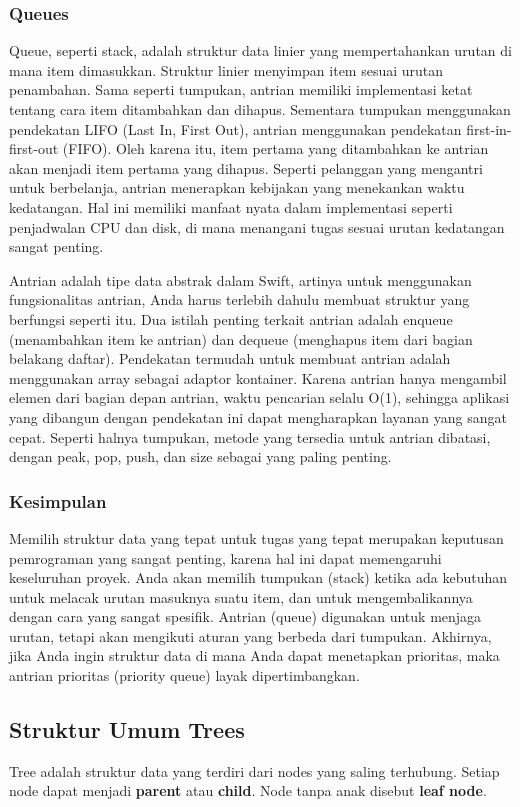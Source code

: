 \documentclass{article}
\begin{document}
\subsubsection{Queues}
Queue, seperti stack, adalah struktur data linier yang mempertahankan urutan di mana item dimasukkan. Struktur linier menyimpan item sesuai urutan penambahan. Sama seperti tumpukan, antrian memiliki implementasi ketat tentang cara item ditambahkan dan dihapus. Sementara tumpukan menggunakan pendekatan LIFO (Last In, First Out), antrian menggunakan pendekatan first-in-first-out (FIFO). Oleh karena itu, item pertama yang ditambahkan ke antrian akan menjadi item pertama yang dihapus. Seperti pelanggan yang mengantri untuk berbelanja, antrian menerapkan kebijakan yang menekankan waktu kedatangan. Hal ini memiliki manfaat nyata dalam implementasi seperti penjadwalan CPU dan disk, di mana menangani tugas sesuai urutan kedatangan sangat penting.

Antrian adalah tipe data abstrak dalam Swift, artinya untuk menggunakan fungsionalitas antrian, Anda harus terlebih dahulu membuat struktur yang berfungsi seperti itu. Dua istilah penting terkait antrian adalah enqueue (menambahkan item ke antrian) dan dequeue (menghapus item dari bagian belakang daftar). Pendekatan termudah untuk membuat antrian adalah menggunakan array sebagai adaptor kontainer. Karena antrian hanya mengambil elemen dari bagian depan antrian, waktu pencarian selalu O(1), sehingga aplikasi yang dibangun dengan pendekatan ini dapat mengharapkan layanan yang sangat cepat. Seperti halnya tumpukan, metode yang tersedia untuk antrian dibatasi, dengan peak, pop, push, dan size sebagai yang paling penting.

\subsubsection{Kesimpulan}
Memilih struktur data yang tepat untuk tugas yang tepat merupakan keputusan pemrograman yang sangat penting, karena hal ini dapat memengaruhi keseluruhan proyek. Anda akan memilih tumpukan (stack) ketika ada kebutuhan untuk melacak urutan masuknya suatu item, dan untuk mengembalikannya dengan cara yang sangat spesifik. Antrian (queue) digunakan untuk menjaga urutan, tetapi akan mengikuti aturan yang berbeda dari tumpukan. Akhirnya, jika Anda ingin struktur data di mana Anda dapat menetapkan prioritas, maka antrian prioritas (priority queue) layak dipertimbangkan.

\subsection{Struktur Umum Trees}
Tree adalah struktur data yang terdiri dari nodes yang saling terhubung. Setiap node dapat menjadi \textbf{parent} atau \textbf{child}. Node tanpa anak disebut \textbf{leaf node}.
\end{document}
